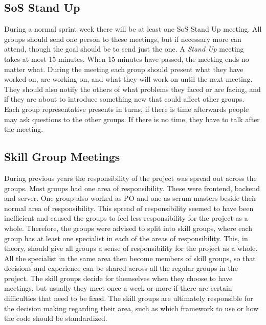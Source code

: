 \subsection{SoS Stand Up}
During a normal sprint week there will be at least one SoS Stand Up meeting.
All groups should send one person to these meetings, but if necessary more can attend, though the goal should be to send just the one.
A \textit{Stand Up} meeting takes at most 15 minutes.
When 15 minutes have passed, the meeting ends no matter what.
\newline
\newline
During the meeting each group should present what they have worked on, are working on, and what they will work on until the next meeting.
They should also notify the others of what problems they faced or are facing, and if they are about to introduce something new that could affect other groups.
Each group representative presents in turns, if there is time afterwards people may ask questions to the other groups.
If there is no time, they have to talk after the meeting.


\subsection{Skill Group Meetings}
During previous years the responsibility of the project was spread out across the groups.
Most groups had one area of responsibility.
These were frontend, backend and server.
One group also worked as PO and one as scrum masters beside their normal area of responsibility.
This spread of responsibility seemed to have been inefficient and caused the groups to feel less responsibility for the project as a whole.
\newline
\newline
Therefore, the groups were advised to split into skill groups, where each group has at least one specialist in each of the areas of responsibility.
This, in theory, should give all groups a sense of responsibility for the project as a whole.
\newline
\newline
All the specialist in the same area then become members of skill groups, so that decisions and experience can be shared across all the regular groups in the project.
The skill groups decide for themselves when they choose to have meetings, but usually they meet once a week or more if there are certain difficulties that need to be fixed.
The skill groups are ultimately responsible for the decision making regarding their area, such as which framework to use or how the code should be standardized.

